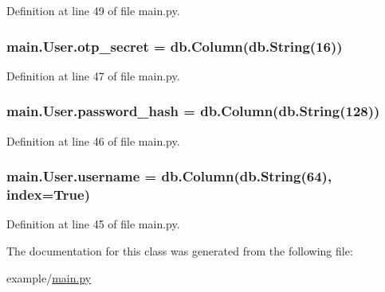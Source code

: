 Definition at line 49 of file main.\+py.

\subsubsection[{\texorpdfstring{otp\+\_\+secret}{otp_secret}}]{\setlength{\rightskip}{0pt plus 5cm}main.\+User.\+otp\+\_\+secret = db.\+Column(db.\+String(16))\hspace{0.3cm}{\ttfamily [static]}}\hypertarget{classmain_1_1User_a2a7a2d67099632b248ad93661e9733d2}{}\label{classmain_1_1User_a2a7a2d67099632b248ad93661e9733d2}


Definition at line 47 of file main.\+py.

\subsubsection[{\texorpdfstring{password\+\_\+hash}{password_hash}}]{\setlength{\rightskip}{0pt plus 5cm}main.\+User.\+password\+\_\+hash = db.\+Column(db.\+String(128))\hspace{0.3cm}{\ttfamily [static]}}\hypertarget{classmain_1_1User_a4bd5dd61d9eca670b326c87ec7f79f94}{}\label{classmain_1_1User_a4bd5dd61d9eca670b326c87ec7f79f94}


Definition at line 46 of file main.\+py.

\subsubsection[{\texorpdfstring{username}{username}}]{\setlength{\rightskip}{0pt plus 5cm}main.\+User.\+username = db.\+Column(db.\+String(64), {\bf index}=True)\hspace{0.3cm}{\ttfamily [static]}}\hypertarget{classmain_1_1User_afc469a49c408f90fb653d979d2669f62}{}\label{classmain_1_1User_afc469a49c408f90fb653d979d2669f62}


Definition at line 45 of file main.\+py.



The documentation for this class was generated from the following file\+:\begin{DoxyCompactItemize}
\item 
example/\hyperlink{main_8py}{main.\+py}\end{DoxyCompactItemize}
